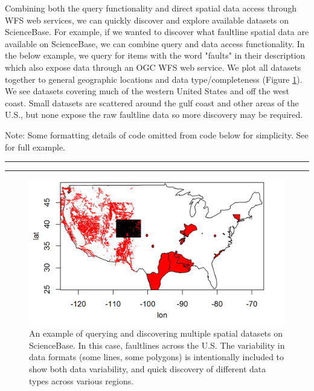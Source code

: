 Combining both the query functionality and direct spatial data access through WFS web services, 
we can quickly discover and explore available datasets on ScienceBase. For example, if we wanted to 
discover what faultline spatial data are available on ScienceBase, we can combine 
query and data access functionality. In the below example, 
we query for items with the word "faults" in their description which also expose data 
through an OGC WFS web service. We plot all datasets together to general geographic locations
and data type/completeness (Figure \ref{figure:faultlinefig}). We see datasets covering much of the western United States and off the west coast. 
Small datasets are scattered around the gulf coast and other areas of the U.S., but none expose the 
raw faultline data so more discovery may be required. 

Note: Some formatting details of code
omitted from code below for simplicity. See \\
for full example.

\noindent\rule{\textwidth}{0.4pt}
\noindent\rule{\textwidth}{0.4pt}

 \begin{figure}[htbp]
   \centering
   \includegraphics{faultlinefig}
   \caption{An example of querying and discovering multiple
   spatial datasets on ScienceBase. In this case, faultlines 
   across the U.S. The variability in data formats (some lines, some polygons)
   is intentionally included to show both data variability, and quick discovery 
   of different data types across various regions.}
   \label{figure:faultlinefig}
 \end{figure}

